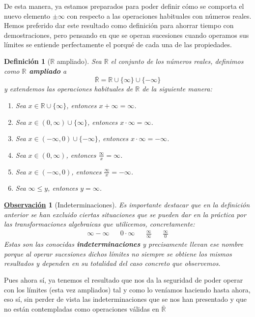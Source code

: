 \documentclass[10pt,a4paper,openright]{book}
\theoremstyle{break}
\newtheorem{defi}{Definición}[chapter]
\newtheorem{obs}{\underline{Observación}}[chapter]
\begin{document}
De esta manera, ya estamos preparados para poder definir cómo se comporta el nuevo elemento $\pm \infty$ con respecto a las operaciones habituales con números reales. Hemos preferido dar este resultado como definición para ahorrar tiempo con demostraciones, pero pensando en que se operan sucesiones cuando operamos sus límites se entiende perfectamente el porqué de cada una de las propiedades.

\begin{defi}[$\mathbb{R}$ ampliado]
Sea $\mathbb{R}$ el conjunto de los números reales, definimos como \textbf{$\mathbb R$ ampliado} a
\[
\overline{\mathbb R}=\mathbb R\cup \{\infty\}\cup \{-\infty\}
\]
y extendemos las operaciones habituales de $\mathbb{R}$ de la siguiente manera:
\begin{enumerate}
\item Sea $x\in \mathbb R\cup \{\infty\}$, entonces $x+\infty = \infty$.
\item Sea $x\in (0,\infty)\cup\{\infty\}$, entonces $x\cdot \infty = \infty$.
\item Sea $x\in (-\infty, 0)\cup\{-\infty\}$, entonces $x\cdot \infty = -\infty $.
\item Sea $x\in (0,\infty)$, entonces $\frac{\infty}{x} = \infty$.
\item Sea $x\in (-\infty, 0)$, entonces $\frac{\infty}{x} = -\infty$.
\item Sea $\infty \leq y$, entonces $y=\infty$.
\end{enumerate}
\end{defi}

\begin{obs}[Indeterminaciones]
Es importante destacar que en la definición anterior se han excluido ciertas situaciones que se pueden dar en la práctica por las transformaciones algebraicas que utilicemos, concretamente:
\begin{align*}
\boxed{\infty -\infty} & & \boxed{0\cdot \infty} & & \boxed{\frac{\infty}{\infty}} & & \boxed{\frac{\infty}{0}}
\end{align*}
Estas son las conocidas \textbf{indeterminaciones} y precisamente llevan ese nombre porque al operar sucesiones dichos límites no siempre se obtiene los mismos resultados y dependen en su totalidad del caso concreto que observemos.
\end{obs}

Pues ahora sí, ya tenemos el resultado que nos da la seguridad de poder operar con los límites (esta vez ampliados) tal y como lo veníamos haciendo hasta ahora, eso sí, sin perder de vista las indeterminaciones que se nos han presentado y que no están contempladas como operaciones válidas en $\overline{\mathbb{R}}$
\end{document}
